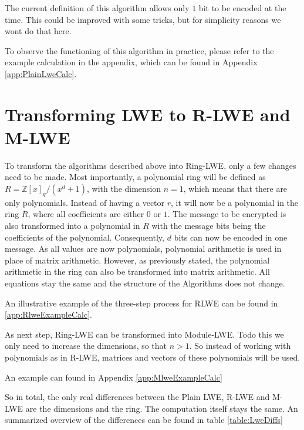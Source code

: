 
The current definition of this algorithm allows only $1$ bit to be encoded at the time. This could be improved with some tricks, but for simplicity reasons we wont do that here. 

To observe the functioning of this algorithm in practice, please refer to the example calculation in the appendix, which can be found in Appendix \ref{app:PlainLweCalc}.

\section{Transforming LWE to R-LWE and M-LWE}
\label{sec:TransformingLweToRlweAndMlwe}

To transform the algorithms described above into Ring-LWE, only a few changes need to be made. Most importantly, a polynomial ring will be defined as $R = \mathbb{Z}[x]_q/(x^d+1)$, with the dimension $n=1$, which means that there are only polynomials. Instead of having a vector $r$, it will now be a polynomial in the ring $R$, where all coefficients are either $0$ or $1$. The message to be encrypted is also transformed into a polynomial in $R$ with the message bits being the coefficients of the polynomial. Consequently, $d$ bits can now be encoded in one message. As all values are now polynomials, polynomial arithmetic is used in place of matrix arithmetic. However, as previously stated, the polynomial arithmetic in the ring can also be transformed into matrix arithmetic. All equations stay the same and the structure of the Algorithms does not change.

An illustrative example of the three-step process for RLWE can be found in \ref{app:RlweExampleCalc}.

As next step, Ring-LWE can be transformed into Module-LWE. Todo this we only need to increase the dimensions, so that $n>1$. So instead of working with polynomials as in R-LWE, matrices and vectors of these polynomials will be used.

An example can found in Appendix \ref{app:MlweExampleCalc}

So in total, the only real differences between the Plain LWE, R-LWE and M-LWE are the dimensions and the ring. The computation itself stays the same. An summarized overview of the differences can be found in table \ref{table:LweDiffs}

